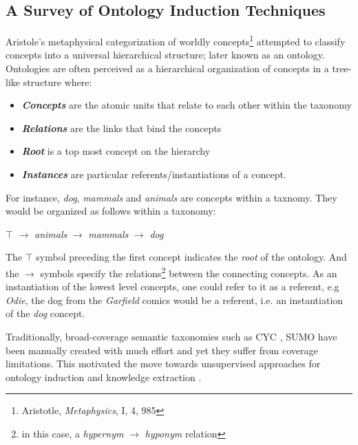 \newpage
\subsection{A Survey of Ontology Induction Techniques} \label{sec:ontology}

Aristole's metaphysical categorization of worldly concepts\footnote{Aristotle, \emph{Metaphysics}, I, 4, 985} attempted to classify concepts into a universal hierarchical structure; later known as an ontology. Ontologies are often perceived as a hierarchical organization of concepts in a tree-like structure where: 

\vspace{2mm}
\begin{itemize}[nosep]
\item \emph{\textbf{Concepts}} are the atomic units that relate to each other within the taxonomy
\item \emph{\textbf{Relations}} are the links that bind the concepts 
\item \emph{\textbf{Root}} is a top most concept on the hierarchy
\item \emph{\textbf{Instances}} are particular referents/instantiations of a concept.
\end{itemize}

\vspace{2mm}
\noindent For instance, \emph{dog}, \emph{mammals} and \emph{animals} are concepts within a taxnomy. They would be organized as follows within a taxonomy:

\vspace{2mm}
\hspace{55mm} $\top$ $\to$ \emph{animals} $\to$ \emph{mammals} $\to$ \emph{dog}
\vspace{2mm}

\noindent The $\top$ symbol preceding the first concept indicates the \emph{root} of the ontology. And the $\to$ symbols specify the relations\footnote{in this case, a \emph{hypernym} $\to$ \emph{hyponym} relation} between the connecting concepts. As an instantiation of the lowest level concepts, one could refer to it as a referent, e.g \emph{Odie}, the dog from the \emph{Garfield} comics would be a referent, i.e. an instantiation of the \emph{dog} concept.

Traditionally, broad-coverage semantic taxonomies such as CYC \citep{lenat1995cyc}, SUMO \citep{PeaseEtAl2002sumo} have been manually created with much effort and yet they suffer from coverage limitations. This motivated the move towards unsupervised approaches for ontology induction and knowledge extraction \citep{lin2001discovery,snow2006semantic,velardi2013ontolearn}. 

